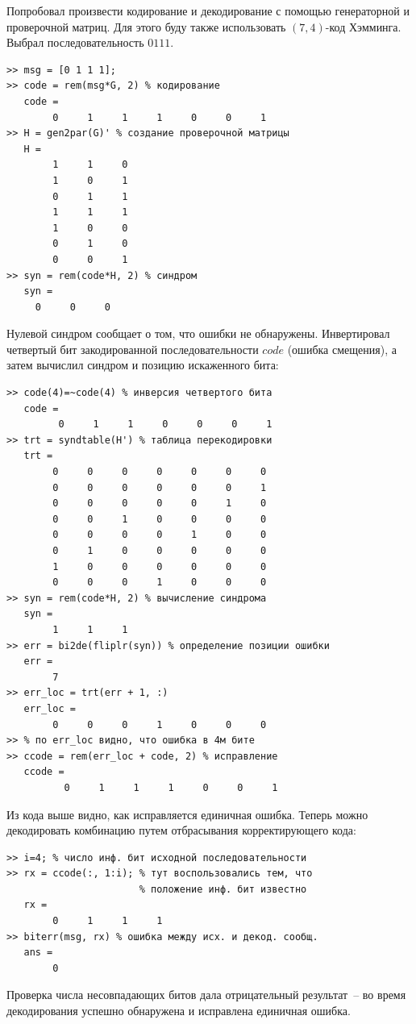 \documentclass[12pt,a4paper]{article}
\begin{document}
  Попробовал произвести кодирование и декодирование с помощью генераторной и проверочной матриц. Для этого буду также использовать $(7,4)$-код Хэмминга. Выбрал последовательность $0111$.
  \begin{lstlisting}
>> msg = [0 1 1 1];
>> code = rem(msg*G, 2) % кодирование
   code =
        0     1     1     1     0     0     1
>> H = gen2par(G)' % создание проверочной матрицы
   H =
        1     1     0
        1     0     1
        0     1     1
        1     1     1
        1     0     0
        0     1     0
        0     0     1
>> syn = rem(code*H, 2) % синдром
   syn =
     0     0     0
  \end{lstlisting}
  Нулевой синдром сообщает о том, что ошибки не обнаружены. Инвертировал четвертый бит закодированной последовательности $code$ (ошибка смещения), а затем вычислил синдром и позицию искаженного бита:
  \begin{lstlisting}
>> code(4)=~code(4) % инверсия четвертого бита
   code =
         0     1     1     0     0     0     1
>> trt = syndtable(H') % таблица перекодировки
   trt =
        0     0     0     0     0     0     0
        0     0     0     0     0     0     1
        0     0     0     0     0     1     0
        0     0     1     0     0     0     0
        0     0     0     0     1     0     0
        0     1     0     0     0     0     0
        1     0     0     0     0     0     0
        0     0     0     1     0     0     0
>> syn = rem(code*H, 2) % вычисление синдрома
   syn =
        1     1     1
>> err = bi2de(fliplr(syn)) % определение позиции ошибки
   err =
        7
>> err_loc = trt(err + 1, :)
   err_loc =
        0     0     0     1     0     0     0
>> % по err_loc видно, что ошибка в 4м бите
>> ccode = rem(err_loc + code, 2) % исправление
   ccode =
          0     1     1     1     0     0     1
  \end{lstlisting}
  Из кода выше видно, как исправляется единичная ошибка. Теперь можно декодировать комбинацию путем отбрасывания корректирующего кода:
  \begin{lstlisting}
>> i=4; % число инф. бит исходной последовательности
>> rx = ccode(:, 1:i); % тут воспользовались тем, что
                       % положение инф. бит известно
   rx =
        0     1     1     1
>> biterr(msg, rx) % ошибка между исх. и декод. сообщ.
   ans =
        0 
  \end{lstlisting}
  Проверка числа несовпадающих битов дала отрицательный результат~-- во время декодирования успешно обнаружена и исправлена единичная ошибка.
  
\end{document}
